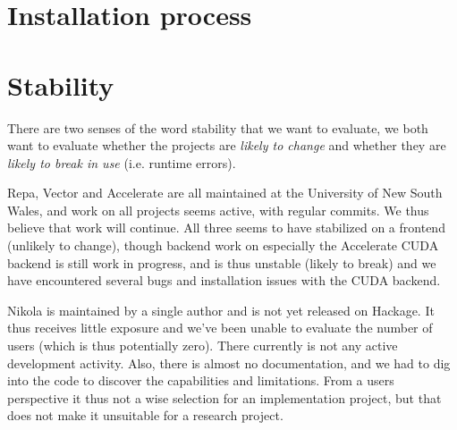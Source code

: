 \section{Installation process}



\section{Stability}

There are two senses of the word stability that we want to evaluate,
we both want to evaluate whether the projects are \emph{likely to
  change} and whether they are \emph{likely to break in use}
(i.e. runtime errors).

Repa, Vector and Accelerate are all maintained at the University of
New South Wales, and work on all projects seems active, with regular
commits. We thus believe that work will continue. All three seems to
have stabilized on a frontend (unlikely to change), though backend
work on especially the Accelerate CUDA backend is still work in
progress, and is thus unstable (likely to break) and we have
encountered several bugs and installation issues with the CUDA
backend.

Nikola is maintained by a single author and is not yet released on
Hackage. It thus receives little exposure and we've been unable to
evaluate the number of users (which is thus potentially zero). There
currently is not any active development activity. Also, there is almost
no documentation, and we had to dig into the code to discover the
capabilities and limitations. From a users perspective it thus not a
wise selection for an implementation project, but that does not make
it unsuitable for a research project.


